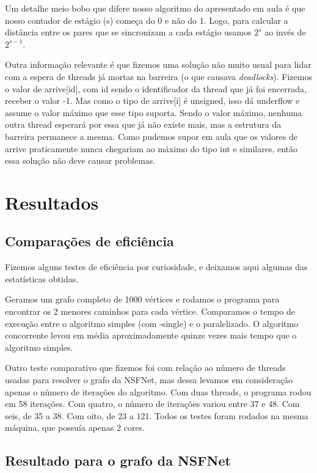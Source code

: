 \documentclass[a4paper,11pt]{article}
\begin{document}
    Um detalhe meio bobo que difere nosso algoritmo do apresentado em aula é que
    nosso contador de estágio (s) começa do 0 e não do 1. Logo, para calcular a
    distância entre os pares que se sincronizam a cada estágio usamos $2^s$ ao
    invés de $2^{s-1}$.

    Outra informação relevante é que fizemos uma solução não muito usual para
    lidar com a espera de threads já mortas na barreira (o que causava
    \textit{deadlocks}). Fizemos o valor de arrive[id], com id sendo o
    identificador da thread que já foi encerrada, receber o valor -1. Mas como
    o tipo de arrive[i] é unsigned, isso dá underflow e assume o valor máximo
    que esse tipo suporta. Sendo o valor máximo, nenhuma outra thread esperará
    por essa que já não existe mais, mas a estrutura da barreira permanece a
    mesma. Como pudemos supor em aula que os valores de arrive praticamente
    nunca chegariam ao máximo do tipo int e similares, então essa solução não
    deve causar problemas.

\section{Resultados}

  \subsection{Comparações de eficiência}
    Fizemos alguns testes de eficiência por curiosidade, e deixamos aqui
    algumas das estatísticas obtidas.

    Geramos um grafo completo de 1000 vértices e rodamos o programa para
    encontrar os 2 menores caminhos para cada vértice. Comparamos o tempo de
    execução entre o algoritmo simples (com -single) e o paralelizado. O
    algoritmo concorrente levou em média aproximadamente quinze vezes mais tempo
    que o algoritmo simples.

    Outro teste comparativo que fizemos foi com relação ao número de threads
    usadas para resolver o grafo da NSFNet, mas dessa levamos em consideração
    apenas o número de iterações do algoritmo. Com duas threads, o programa
    rodou em 58 iterações. Com quatro, o número de iterações variou entre 37 e
    48. Com seis, de 35 a 38. Com oito, de 23 a 121. Todos os testes foram
    rodados na mesma máquina, que possuía apenas 2 cores.

  \subsection{Resultado para o grafo da NSFNet}
\end{document}
